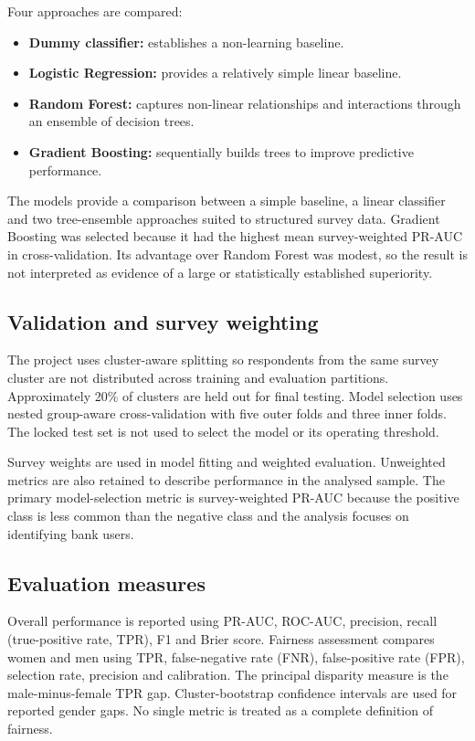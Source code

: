 \documentclass[11pt,a4paper]{article}
\begin{document}
Four approaches are compared:
\begin{itemize}[leftmargin=*]
  \item \textbf{Dummy classifier:} establishes a non-learning baseline.
  \item \textbf{Logistic Regression:} provides a relatively simple linear baseline.
  \item \textbf{Random Forest:} captures non-linear relationships and interactions through an ensemble of decision trees.
  \item \textbf{Gradient Boosting:} sequentially builds trees to improve predictive performance.
\end{itemize}
The models provide a comparison between a simple baseline, a linear classifier and two tree-ensemble approaches suited to structured survey data. Gradient Boosting was selected because it had the highest mean survey-weighted PR-AUC in cross-validation. Its advantage over Random Forest was modest, so the result is not interpreted as evidence of a large or statistically established superiority.

\subsection{Validation and survey weighting}

The project uses cluster-aware splitting so respondents from the same survey cluster are not distributed across training and evaluation partitions. Approximately 20\% of clusters are held out for final testing. Model selection uses nested group-aware cross-validation with five outer folds and three inner folds. The locked test set is not used to select the model or its operating threshold.

Survey weights are used in model fitting and weighted evaluation. Unweighted metrics are also retained to describe performance in the analysed sample. The primary model-selection metric is survey-weighted PR-AUC because the positive class is less common than the negative class and the analysis focuses on identifying bank users.

\subsection{Evaluation measures}

Overall performance is reported using PR-AUC, ROC-AUC, precision, recall (true-positive rate, TPR), F1 and Brier score. Fairness assessment compares women and men using TPR, false-negative rate (FNR), false-positive rate (FPR), selection rate, precision and calibration. The principal disparity measure is the male-minus-female TPR gap. Cluster-bootstrap confidence intervals are used for reported gender gaps. No single metric is treated as a complete definition of fairness.
\end{document}
